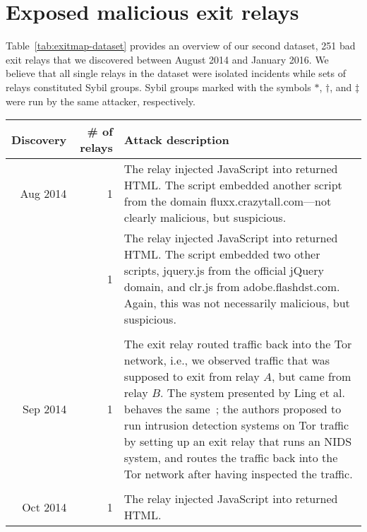 \appendix

\section{Exposed malicious exit relays}
\label{sec:malicious-relays}
Table~\ref{tab:exitmap-dataset} provides an overview of our second dataset, 251
bad exit relays that we discovered between August 2014 and January 2016.  We
believe that all single relays in the dataset were isolated incidents while sets
of relays constituted Sybil groups.  Sybil groups marked with the symbols
$*$, $\dagger$, and $\ddagger$ were run by the same attacker, respectively.

\begin{table*}
\small
\centering
\begin{tabularx}{\textwidth}{r r X}
\toprule
\textbf{Discovery} & \textbf{\# of relays} & \textbf{Attack description} \\
\midrule
Aug 2014 & 1 & The relay injected JavaScript into returned HTML.  The script
embedded another script from the domain fluxx.crazytall.com---not clearly
malicious, but suspicious. \\

& 1 & The relay injected JavaScript into returned HTML.  The script
embedded two other scripts, jquery.js from the official jQuery domain, and
clr.js from adobe.flashdst.com.  Again, this was not necessarily malicious, but
suspicious. \\

& & \\

Sep 2014 & 1 & The exit relay routed traffic back into the Tor network, i.e., we
observed traffic that was supposed to exit from relay $A$, but came from relay
$B$.  The system presented by Ling et al. behaves the same~\cite{Ling2015a};
the authors proposed to run intrusion detection systems on Tor traffic by
setting up an exit relay that runs an NIDS system, and routes the traffic back
into the Tor network after having inspected the traffic. \\

& & \\

Oct 2014 & 1 & The relay injected JavaScript into returned HTML. \\


\end{tabularx}
\end{table*}
